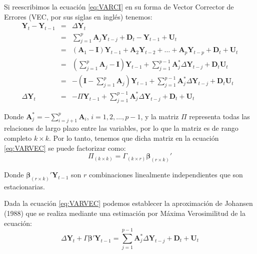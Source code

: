 \documentclass[
]{book}
\begin{document}
Si reescribimos la ecuación \eqref{eq:VARCI} en su forma de Vector Corrector de Errores (VEC, por sus siglas en inglés) tenemos:
\begin{eqnarray}
    \mathbf{Y}_t - \mathbf{Y}_{t-1} & = & \Delta \mathbf{Y}_t \nonumber \\
    & = & \sum_{j=1}^p \mathbf{A}_j \mathbf{Y}_{t-j} + \mathbf{D}_t - \mathbf{Y}_{t-1} + \mathbf{U}_t \nonumber \\
    & = & (\mathbf{A}_1 - \mathbf{I}) \mathbf{Y}_{t-1} + \mathbf{A}_2 \mathbf{Y}_{t-2} + \ldots + \mathbf{A}_p \mathbf{Y}_{t-p} + \mathbf{D}_t + \mathbf{U}_t \nonumber \\
    & = & \left( \sum_{j=1}^{p} \mathbf{A}_j - \mathbf{I} \right) \mathbf{Y}_{t-1} + \sum_{j=1}^{p-1} \mathbf{A}^*_j \Delta \mathbf{Y}_{t-j} + \mathbf{D}_t \mathbf{U}_t \nonumber \\
    & = & - \left( \mathbf{I} - \sum_{j=1}^{p} \mathbf{A}_j \right) \mathbf{Y}_{t-1} + \sum_{j=1}^{p-1} \mathbf{A}^*_j \Delta \mathbf{Y}_{t-j} + \mathbf{D}_t \mathbf{U}_t \nonumber \\
    \Delta \mathbf{Y}_t & = & - \Pi \mathbf{Y}_{t-1} + \sum_{j=1}^{p-1} \mathbf{A}^*_j \Delta \mathbf{Y}_{t-j} + \mathbf{D}_t + \mathbf{U}_t
    \label{eq:VARVEC}
\end{eqnarray}

Donde \(\mathbf{A}_j^* = - \sum_{i=j+1}^p \mathbf{A}_i\), \(i = 1, 2, \ldots, p-1\), y la matriz \(\Pi\) representa todas las relaciones de largo plazo entre las variables, por lo que la matriz es de rango completo \(k \times k\). Por lo tanto, tenemos que dicha matriz en la ecuación \eqref{eq:VARVEC} se puede factorizar como:
\begin{equation}
    \Pi_{(k \times k)} = \Gamma_{(k \times r)} \boldsymbol{\beta}_{(r \times k)}'
    \label{Pi_Matrix}
\end{equation}

Donde \(\boldsymbol{\beta}_{(r \times k)}' \mathbf{Y}_{t-1}\) son \(r\) combinaciones linealmente independientes que son estacionarias.

Dada la ecuación \eqref{eq:VARVEC} podemos establecer la aproximación de Johansen (1988) que se realiza mediante una estimación por Máxima Verosimilitud de la ecuación:
\begin{equation}
    \Delta \mathbf{Y}_t + \Gamma \boldsymbol{\beta}' \mathbf{Y}_{t-1} = \sum_{j=1}^{p-1} \mathbf{A}^*_j \Delta \mathbf{Y}_{t-j} + \mathbf{D}_t + \mathbf{U}_t
\end{equation}
\end{document}
